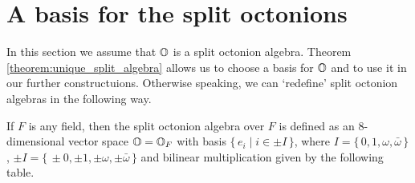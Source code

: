 \section{A basis for the split octonions}

In this section we assume that $\mathbb{O}$ is a split octonion algebra. 
Theorem \ref{theorem:unique_split_algebra} 
allows us to choose a basis for $\mathbb{O}$ and to use it in our further constructuions.
Otherwise speaking, we can `redefine' split octonion algebras in the following way. 

\begin{definition}
	\label{def:split_octonions}
	If $F$ is any field, then the split octonion algebra over $F$ is defined as an
	$8$-dimensional vector space $\mathbb{O} = \mathbb{O}_F$ with basis $\{\,e_i \mid i \in \pm I\,\}$,
	where $I = \{\,0,1,\omega,\bar{\omega}\,\}$, $\pm I = \{\,\pm 0, \pm 1, \pm \omega,
	\pm \bar{\omega}\,\}$ and bilinear multiplication given by the following table.
\end{definition}

